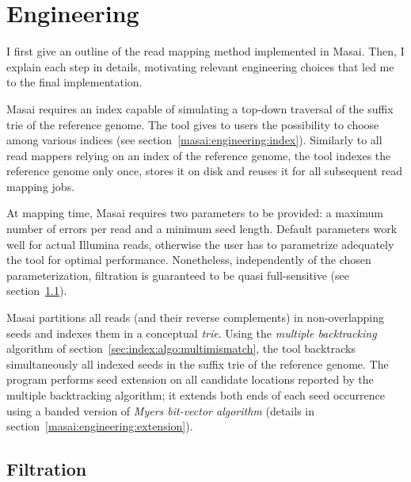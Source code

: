 
\section{Engineering}

I first give an outline of the read mapping method implemented in Masai.
Then, I explain each step in details, motivating relevant engineering choices that led me to the final implementation.

Masai requires an index capable of simulating a top-down traversal of the suffix trie of the reference genome.
The tool gives to users the possibility to choose among various indices (see section~\ref{masai:engineering:index}).
Similarly to all read mappers relying on an index of the reference genome, the tool indexes the reference genome only once, stores it on disk and reuses it for all subsequent read mapping jobs.

At mapping time, Masai requires two parameters to be provided: a maximum number of errors per read and a minimum seed length.
Default parameters work well for actual Illumina reads, otherwise the user has to parametrize adequately the tool for optimal performance.
Nonetheless, independently of the chosen parameterization, filtration is guaranteed to be quasi full-sensitive (see section~\ref{masai:engineering:seeding}).

Masai partitions all reads (and their reverse complements) in non-overlapping seeds and indexes them in a conceptual \emph{trie}.
Using the \emph{multiple backtracking} algorithm of section~\ref{sec:index:algo:multimismatch}, the tool backtracks simultaneously all indexed seeds in the suffix trie of the reference genome.
The program performs seed extension on all candidate locations reported by the multiple backtracking algorithm;
it extends both ends of each seed occurrence using a banded version of \emph{Myers bit-vector algorithm} \citep{Myers1999} (details in section~\ref{masai:engineering:extension}).

\subsection{Filtration}
\label{masai:engineering:seeding}


